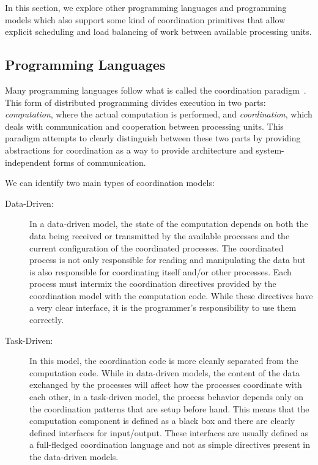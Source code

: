 
In this section, we explore other programming languages and programming models
which also support some kind of coordination primitives that allow explicit
scheduling and load balancing of work between available processing units.

\subsection{Programming Languages}

Many programming languages follow what is called the coordination
paradigm~\cite{Papadopoulos98coordinationmodels}. This form of distributed
programming divides execution in two parts: \emph{computation}, where the actual
computation is performed, and \emph{coordination}, which deals with
communication and cooperation between processing units. This paradigm attempts
to clearly distinguish between these two parts by providing abstractions for
coordination as a way to provide architecture and system-independent forms of
communication.

We can identify two main types of coordination models:

\begin{description}
   \item[Data-Driven:]
   
   In a data-driven model, the state of the computation depends on both the data
   being received or transmitted by the available processes and the current configuration
   of the coordinated processes. The coordinated process is not only responsible
   for reading and manipulating the data but is also responsible for
   coordinating itself and/or other processes. Each process must intermix the
   coordination directives provided by the coordination model with the
   computation code. While these directives have a very clear interface, it is
   the programmer's responsibility to use them correctly.

   \item[Task-Driven:]
   
   In this model, the coordination code is more cleanly separated from the
   computation code. While in data-driven models, the content of the data
   exchanged by the processes will affect how the processes coordinate with each
   other, in a task-driven model, the process behavior depends only on the
   coordination patterns that are setup before hand. This means that the
   computation component is defined as a black box and there are clearly defined
   interfaces for input/output. These interfaces are usually defined as a
   full-fledged coordination language and not as simple directives present in
   the data-driven models.  \end{description}

